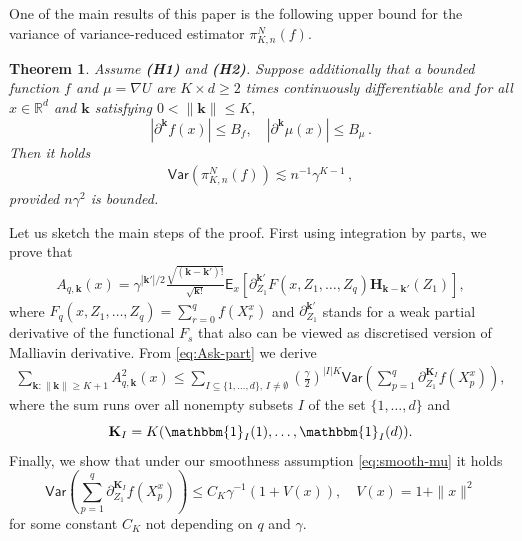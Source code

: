 \documentclass[bj]{imsart}
\def\PVar{\mathsf{Var}}
\newtheorem{thm}{Theorem}
\newcommand{\indi}[1]{\mathbbm{1}_{#1}}
\newcommand{\tcr}[1]{\textcolor{red}{#1}}
\def\eqsp{\,}
\begin{document}
One of the main results of this paper is the following  upper bound for the variance of variance-reduced estimator $\pi_{K,n}^{N}(f).$
\begin{thm}\label{th:mr}
Assume {\bf (H1)} and {\bf (H2)}.
Suppose additionally that a bounded function $f$ and $\mu=\nabla U$ are $K \times d \geq 2$ times continuously differentiable
and for all $x\in\mathbb R^d$ and  \(\mathbf{k}\) satisfying \(0<\|\mathbf{k}\|\leq  K,\)
\begin{equation}
\label{eq:smooth-mu}
|\partial^{\mathbf{k}} f(x)|\le  B_f, \quad |\partial^{\mathbf{k}} \mu (x)|\leq B_\mu \eqsp.
\end{equation}
Then  it holds
\begin{eqnarray}
\label{eq:var-bound}
\PVar\left(\pi_{K,n}^{N}(f)\right)\lesssim n^{-1} \gamma^{K-1} \eqsp,
\end{eqnarray}
provided $n\gamma^2$ is bounded.
\end{thm}
Let us sketch the main steps of the proof. First using integration by parts, we prove that
\begin{eqnarray}
\label{eq:Ask-part}
A_{q,\mathbf{k}}(x)=\gamma^{|\mathbf{k}'|/2}\frac{\sqrt{(\mathbf{k}-\mathbf{k}')!}}{\sqrt{\mathbf{k}!}}\mathsf{E}_x\left[ \partial_{Z_1}^{\mathbf{k}'} F(x,Z_1,\ldots,Z_q) \mathbf{H}_{\mathbf{k}-\mathbf{k}'}(Z_{1})\right],
\end{eqnarray}
where $F_q(x,Z_1,\ldots,Z_q)=\sum_{r=0}^q f(X^x_r)$ and $\partial_{Z_1}^{\mathbf{k}'}$
stands for a weak partial derivative of the functional $F_s$ that also can be viewed as discretised version of Malliavin derivative. From \eqref{eq:Ask-part} we derive
\begin{eqnarray*}
\sum_{\mathbf{k}\colon\|\mathbf{k}\|\geq K+1} A^2_{q,\mathbf{k}}(x)\leq \sum_{I\subseteq\{1,\ldots,d\},\, I\neq \emptyset}
\left(\frac{\gamma}{2}\right)^{|I|K}
\PVar \left( \sum_{p=1}^{q}\partial_{Z_{1}}^{\mathbf{K}_I}f\left(X_{p}^x\right)
\right),
\end{eqnarray*}
where the sum runs over all nonempty subsets $I$ of the set $\{1,\ldots,d\}$ and
\[
\mathbf{\mathbf{K}}_{I}=K(\indi{I}(1),\ldots, \indi{I}(d)).
\]
 Finally, we show  that under our smoothness assumption \eqref{eq:smooth-mu} it holds
\begin{equation*}
\PVar \left(\sum_{p=1}^{q}\partial_{Z_{1}}^{\mathbf{K}_I}f\left(X^x_{p}\right)
\right)\leq C_{K}\gamma^{-1}(1+V(x)), \quad V(x) = 1 + \|x\|^2
\end{equation*}
for some constant $C_K$ not depending on $q$ and $\gamma$.
\end{document}
